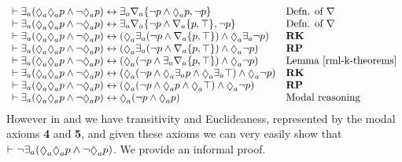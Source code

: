 $$
\begin{array}{ll}
    \proves \somerefsA (\possibleA \possibleA \atomP \land \lnot \possibleA \atomP) \iff \somerefsA \coversA \{\lnot \atomP \land \possibleA \atomP, \lnot \atomP\} & \text{Defn. of $\covers$}\\
    \proves \somerefsA (\possibleA \possibleA \atomP \land \lnot \possibleA \atomP) \iff \somerefsA \coversA \{\lnot \atomP \land \coversA \{\atomP, \top\}, \lnot \atomP\} & \text{Defn. of $\covers$}\\
    \proves \somerefsA (\possibleA \possibleA \atomP \land \lnot \possibleA \atomP) \iff (\possibleA \somerefsA (\lnot \atomP \land \coversA \{\atomP, \top\}) \land \possibleA \somerefsA \lnot \atomP)& {\bf RK}\\
    \proves \somerefsA (\possibleA \possibleA \atomP \land \lnot \possibleA \atomP) \iff (\possibleA \somerefsA (\lnot \atomP \land \coversA \{\atomP, \top\}) \land \possibleA \lnot \atomP)& {\bf RP}\\
    \proves \somerefsA (\possibleA \possibleA \atomP \land \lnot \possibleA \atomP) \iff (\possibleA (\lnot \atomP \land \somerefsA \coversA \{\atomP, \top\}) \land \possibleA \lnot \atomP)& \text{Lemma~\ref{rml-k-theorems}}\\
    \proves \somerefsA (\possibleA \possibleA \atomP \land \lnot \possibleA \atomP) \iff (\possibleA (\lnot \atomP \land \possibleA \somerefsA \atomP \land \possibleA \somerefsA \top) \land \possibleA \lnot \atomP)& {\bf RK}\\
    \proves \somerefsA (\possibleA \possibleA \atomP \land \lnot \possibleA \atomP) \iff (\possibleA (\lnot \atomP \land \possibleA \atomP \land \possibleA \top) \land \possibleA \lnot \atomP)& {\bf RP}\\
    \proves \somerefsA (\possibleA \possibleA \atomP \land \lnot \possibleA \atomP) \iff \possibleA (\lnot \atomP \land \possibleA \atomP)& \text{Modal reasoning}
\end{array}
$$
However in \logicRmlKFF{} and \logicRmlKD{} we have transitivity and Euclideaness, represented by the modal axioms {\bf 4} and {\bf 5}, and given these axioms we can very easily show that $\proves \lnot \somerefsA (\possibleA \possibleA \atomP \land \lnot \possibleA \atomP)$.
We provide an informal proof.
